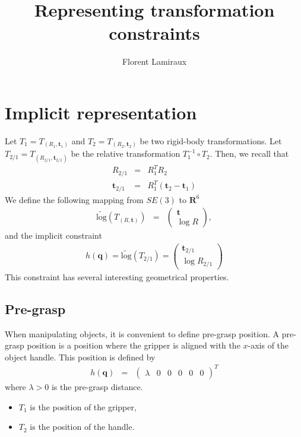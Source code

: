 \documentclass {article}
\title {Representing transformation constraints}
\author {Florent Lamiraux}
\date {}
\newcommand\trans{\mathbf{t}}
\newcommand\conf{\mathbf{q}}
\newcommand\reals{\mathbf{R}}
\newcommand\pseudolog{\widetilde{\mbox{log}}}
\begin{document}
\maketitle

\section {Implicit representation}\label{sec:implicit}

Let $T_1 = T_{(R_1,\trans_1)}$ and $T_2 = T_{(R_2,\trans_2)}$ be two rigid-body transformations. Let $T_{2/1} = T_{(R_{2/1},\trans_{2/1})}$ be the relative transformation $T_1^{-1}\circ T_2$. Then, we recall that
\begin{eqnarray*}
  R_{2/1} &=& R_1^T R_2 \\
  \trans_{2/1} &=& R_1^T (\trans_2-\trans_1)
\end{eqnarray*}
We define the following mapping from $SE(3)$ to $\reals^6$
\begin{eqnarray*}
  \pseudolog (T_{(R,\trans)}) &=& \left(\begin {array}{c} \trans \\ \log R \end{array}\right),
\end {eqnarray*}
and the implicit constraint
\begin {eqnarray}\label{eq:error-se3}
h (\conf) = \pseudolog (T_{2/1}) = \left(\begin {array}{c} \trans_{2/1} \\ \log R_{2/1} \end{array}\right)
\end {eqnarray}
This constraint has several interesting geometrical properties.

\subsection {Pre-grasp}

When manipulating objects, it is convenient to define pre-grasp position. A pre-grasp position is a position where the gripper is aligned with the $x$-axis of the object handle. This position is defined by
\begin {eqnarray}\label{eq:pregrasp}
  h (\conf) &=& \left (\begin {array}{cccccc} \lambda & 0 & 0 & 0 & 0 & 0 \end{array}\right)^{T}
\end {eqnarray}
where $\lambda > 0$ is the pre-grasp distance.
\begin{itemize}
\item $T_1$ is the position of the gripper,
\item $T_2$ is the position of the handle.
\end {itemize}
\end{document}
